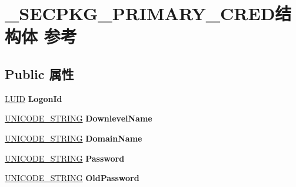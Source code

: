 \hypertarget{struct___s_e_c_p_k_g___p_r_i_m_a_r_y___c_r_e_d}{}\section{\+\_\+\+S\+E\+C\+P\+K\+G\+\_\+\+P\+R\+I\+M\+A\+R\+Y\+\_\+\+C\+R\+E\+D结构体 参考}
\label{struct___s_e_c_p_k_g___p_r_i_m_a_r_y___c_r_e_d}
\subsection*{Public 属性}
\begin{DoxyCompactItemize}
\item 
\mbox{\label{struct___s_e_c_p_k_g___p_r_i_m_a_r_y___c_r_e_d_ae464750714188f180073048ba80647a8}} 
\hyperlink{struct___l_u_i_d}{L\+U\+ID} {\bfseries Logon\+Id}
\item 
\mbox{\label{struct___s_e_c_p_k_g___p_r_i_m_a_r_y___c_r_e_d_ad1209a86260ead9120d4fdb591f395f0}} 
\hyperlink{struct___u_n_i_c_o_d_e___s_t_r_i_n_g}{U\+N\+I\+C\+O\+D\+E\+\_\+\+S\+T\+R\+I\+NG} {\bfseries Downlevel\+Name}
\item 
\mbox{\label{struct___s_e_c_p_k_g___p_r_i_m_a_r_y___c_r_e_d_ab231cc6ae23e870f9d76af5e32fad267}} 
\hyperlink{struct___u_n_i_c_o_d_e___s_t_r_i_n_g}{U\+N\+I\+C\+O\+D\+E\+\_\+\+S\+T\+R\+I\+NG} {\bfseries Domain\+Name}
\item 
\mbox{\label{struct___s_e_c_p_k_g___p_r_i_m_a_r_y___c_r_e_d_a86fea29b688b265a1351c6ed3c41b4af}} 
\hyperlink{struct___u_n_i_c_o_d_e___s_t_r_i_n_g}{U\+N\+I\+C\+O\+D\+E\+\_\+\+S\+T\+R\+I\+NG} {\bfseries Password}
\item 
\mbox{\label{struct___s_e_c_p_k_g___p_r_i_m_a_r_y___c_r_e_d_ad8298f289e71119281ece2a14b1288c1}} 
\hyperlink{struct___u_n_i_c_o_d_e___s_t_r_i_n_g}{U\+N\+I\+C\+O\+D\+E\+\_\+\+S\+T\+R\+I\+NG} {\bfseries Old\+Password}
\item 
\mbox{\label{struct___s_e_c_p_k_g___p_r_i_m_a_r_y___c_r_e_d_aebf5297f94de75b77f9538b1b55c34c8}} 

\end{DoxyCompactItemize}
